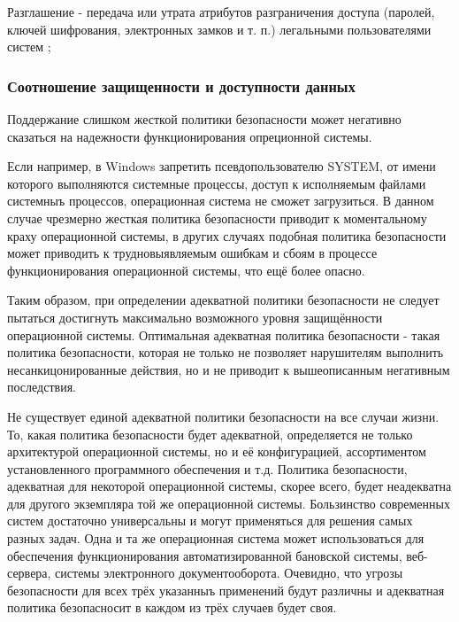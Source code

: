 Разглашение - передача или утрата атрибутов разграничения доступа (паролей, ключей шифрования, электронных замков и т. п.) легальными пользователями систем \cite{Smirnov2007};

\subsubsection{Соотношение защищенности и доступности данных}
Поддержание слишком жесткой политики безопасности может негативно
сказаться на надежности функционирования опреционной системы.

Если например, в Windows запретить псевдопользователю SYSTEM, от имени которого выполняются
системные процессы, доступ к исполняемым файлами системныъ процессов, операционная система не
сможет загрузиться. В данном случае чрезмерно жесткая политика безопасности приводит к
моментальному краху операционной системы, в других случаях подобная политика безопасности может
приводить к трудновыявляемым ошибкам и сбоям в процессе функционирования операционной системы,
что ещё более опасно.

Таким образом, при определении адекватной политики безопасности не следует пытаться достигнуть
максимально возможного уровня защищённости операционной системы. Оптимальная адекватная политика
безопасности - такая политика безопасности, которая не только не позволяет нарушителям выполнить
несанкицонированные действия, но и не приводит к вышеописанным негативным последствия.

Не существует единой адекватной политики безопасности на все случаи жизни. То, какая политика
безопасности будет адекватной, определяется не только архитектурой операционной системы, но и её
конфигурацией, ассортиментом установленного программного обеспечения и т.д. Политика безопасности,
адекватная для некоторой операционной системы, скорее всего, будет неадекватна для другого
экземпляра той же операционной системы. Бользинство современных систем достаточно универсальны и
могут применяться для решения самых разных задач. Одна и та же операционная система может
использоваться для обеспечения функционирования автоматизированной бановской системы, веб-сервера,
системы электронного документооборота. Очевидно, что угрозы безопасности для всех трёх указанныъ
применений будут различны и адекватная политика безопасносит в каждом из трёх случаев будет своя.

